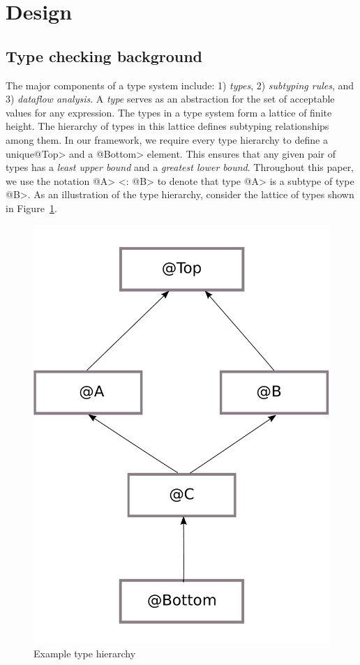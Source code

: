 \section{Design}
\subsection{Type checking background}
The major components of a type system include: 1) \textit{types}, 2) \textit{subtyping rules}, and 3) \textit{dataflow analysis}.
A \textit{type} serves as an abstraction for the set of acceptable values for any expression. The types in a type system form a lattice of finite height. 
The hierarchy of types in this lattice defines subtyping relationships among them.
In our framework, we require every type hierarchy to define a unique\<@Top> and a \<@Bottom> element. This ensures that
any given pair of types has a \textit{least upper bound} and a \textit{greatest lower bound}.
Throughout this paper, we use the notation \<@A> <: \<@B> to denote that type \<@A> is a subtype of type \<@B>.
As an illustration of the type hierarchy, consider the lattice of types shown in Figure~\ref{fig-example-lattice}.
\begin{figure}
	\begin{center}
		\includegraphics[scale=0.15]{lattice}
	\end{center}
	\caption{Example type hierarchy}
	\label{fig-example-lattice}
\end{figure}
